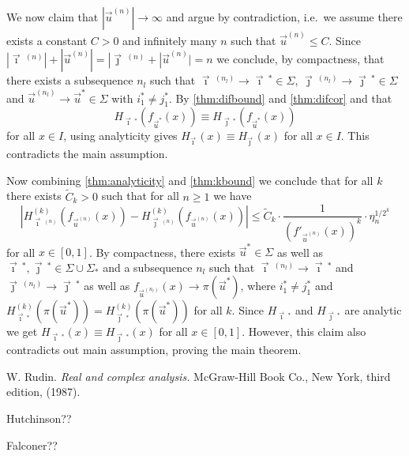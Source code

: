 \documentclass[12pt,]{article}
\theoremstyle{definition}
\theoremstyle{remark}
\newcommand{\0}{\mathbf{0}}
\newcommand{\bi}{\vec{\imath}\,}
\newcommand{\bj}{\vec{\jmath}\,}
\newcommand{\bu}{{\vec{u}}}
\begin{document}
We now claim that $|\bu^{(n)}| \to \infty$ and argue by contradiction, i.e.\ we assume there
exists a constant $C>0$ and infinitely many $n$ such that $\bu^{(n)} \leq C$. 
Since $|\bi^{(n)}|+ |\bu^{(n)}| = |\bj^{(n)}+|\bu^{(n)}| = n$ we conclude, by compactness, that
there exists a subsequence $n_l$ such that $\bi^{(n_l)} \to \bi^*\in\Sigma$,
$\bj^{(n_l)}\to\bj^*\in\Sigma$ and $\bu^{(n_l)}\to \bu^*\in\Sigma$ with $i_1^*\neq j_1^*$.
By \cref{thm:difbound} and \cref{thm:difcor} and that 
\[
  H_{\bi^*}(f_{\bu^*}(x))\equiv H_{\bj^*}(f_{\bu^*}(x)) 
\]
for all $x\in I$, using analyticity gives $H_{\bi}(x) \equiv H_{\bj}(x)$ for all $x\in I$. This
contradicts the main assumption.

Now combining \cref{thm:analyticity} and \cref{thm:kbound} we conclude that for all $k$ there
exists $\widetilde{C}_k>0$ such that for all $n\geq 1$ we have
\[
  |H_{\bi^{(n)}}^{(k)}(f_{\bu^{(n)}}(x)) - H_{\bj^{(n)}}^{(k)}(f_{\bu^{(n)}}(x))|
  \leq \widetilde{C}_k \cdot \frac{1}{(f'_{\bu^{(n)}}(x))^k}\cdot\eta_n^{1/2^k}
\]
for all $x\in[0,1]$.
By compactness, there exists $\bu^*\in\Sigma$ as well as $\bi^*,\bj^*\in\Sigma\cup\Sigma_*$ and a
subsequence $n_l$ such that $\bi^{(n_l)}\to \bi^*$ and $\bj^{(n_l)}\to \bj^*$ as well as
$f_{\bu^{(n_l)}}(x) \to \pi(\bu^*)$, where $i_1^*\neq j_1^*$ and
$H_{\bi^*}^{(k)}(\pi(\bu^*))=H_{\bj^*}^{(k)}(\pi(\bu^*))$ for all $k$.
Since $H_{\bi^*}$ and $H_{\bj^*}$ are analytic we get $H_{\bi^*}(x)\equiv H_{\bj^*}(x)$ for all
$x\in[0,1]$. However, this claim also contradicts out main assumption, proving the main theorem.

\begin{thebibliography}{99}
  W. Rudin. 
  \textit{Real and complex analysis.}
  McGraw-Hill Book Co., New York, third edition, (1987).

  Hutchinson??

  Falconer??

\end{thebibliography}
\end{document}
